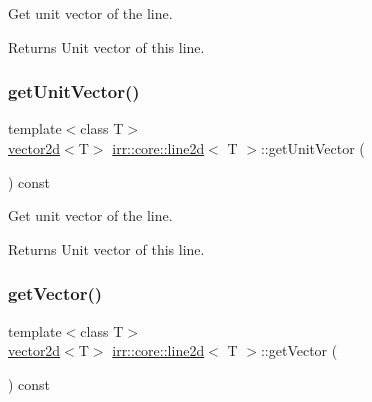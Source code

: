 Get unit vector of the line. 

\begin{DoxyReturn}{Returns}
Unit vector of this line. 
\end{DoxyReturn}
\mbox{\label{classirr_1_1core_1_1line2d_ae3f1a52b3057168c41d283d100d13c79}} 
\subsubsection{\texorpdfstring{get\+Unit\+Vector()}{getUnitVector()}\hspace{0.1cm}{\footnotesize\ttfamily [2/2]}}
{\footnotesize\ttfamily template$<$class T$>$ \\
\hyperlink{classirr_1_1core_1_1vector2d}{vector2d}$<$T$>$ \hyperlink{classirr_1_1core_1_1line2d}{irr\+::core\+::line2d}$<$ T $>$\+::get\+Unit\+Vector (\begin{DoxyParamCaption}{ }\end{DoxyParamCaption}) const\hspace{0.3cm}{\ttfamily [inline]}}



Get unit vector of the line. 

\begin{DoxyReturn}{Returns}
Unit vector of this line. 
\end{DoxyReturn}
\mbox{\label{classirr_1_1core_1_1line2d_aeb0b7bc3987165abc0eaca7f0e506a59}} 
\subsubsection{\texorpdfstring{get\+Vector()}{getVector()}\hspace{0.1cm}{\footnotesize\ttfamily [1/2]}}
{\footnotesize\ttfamily template$<$class T$>$ \\
\hyperlink{classirr_1_1core_1_1vector2d}{vector2d}$<$T$>$ \hyperlink{classirr_1_1core_1_1line2d}{irr\+::core\+::line2d}$<$ T $>$\+::get\+Vector (\begin{DoxyParamCaption}{ }\end{DoxyParamCaption}) const\hspace{0.3cm}{\ttfamily [inline]}}



